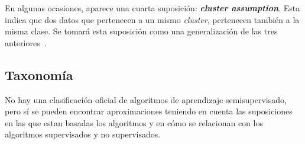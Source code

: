 En algunas ocasiones, aparece una cuarta suposición: \textit{\textbf{cluster assumption}}. Esta indica que dos datos que pertenecen a un mismo \textit{cluster}, pertenecen también a la misma clase. Se tomará esta suposición como una generalización de las tres anteriores~\cite{Engelen:semi-supervised}.


\subsection{Taxonomía}\label{sec3:tax}
No hay una clasificación oficial de algoritmos de aprendizaje semisupervisado, pero sí se pueden encontrar aproximaciones teniendo en cuenta las suposiciones en las que estan basadas los algoritmos y en cómo se relacionan con los algoritmos supervisados y no supervisados.

